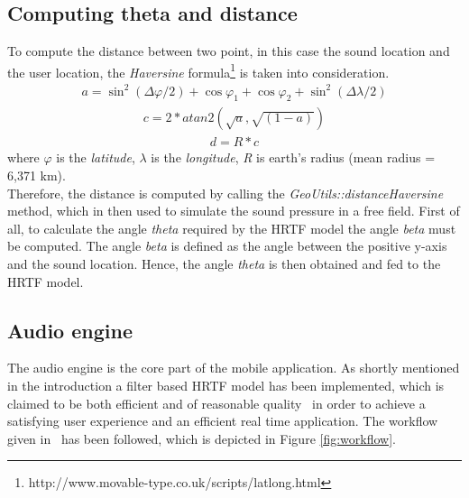 \documentclass[journal]{IEEEtran}
\begin{document}
\subsection{Computing theta and distance}
To compute the distance between two point, in this case the sound location and the user location, the \textit{Haversine} formula\footnote{http://www.movable-type.co.uk/scripts/latlong.html} is taken into consideration.
\begin{equation}\label{eq:distancehaversine1}
\begin{split}
  a = {\sin}^{2}(\Delta\varphi / 2) + \cos \varphi _1 + \cos \varphi _2 + \sin^2(\Delta\lambda / 2)
\end{split}
\end{equation}
\begin{equation}\label{eq:distancehaversine2}
\begin{split}
  c = 2 * atan2(\sqrt{a},\sqrt{(1-a)}) 
\end{split}
\end{equation}
\begin{equation}\label{eq:distancehaversine3}
\begin{split}
  d = R * c
\end{split}
\end{equation}
where $\varphi$ is the \emph{latitude}, $\lambda$ is the \emph{longitude}, \emph{R} is earth's radius (mean radius = 6,371 km). \\
Therefore, the distance is computed by calling the \emph{GeoUtils::distanceHaversine} method, which in then used to simulate the sound pressure in a free field. First of all, to calculate the angle \textit{theta} required by the HRTF model the angle \textit{beta} must be computed. The angle \textit{beta} is defined as the angle between the positive y-axis and the sound location. Hence, the angle \textit{theta} is then obtained and fed to the HRTF model.

\subsection{Audio engine}
The audio engine is the core part of the mobile application. As shortly mentioned in the introduction a filter based HRTF model has been implemented, which is claimed to be both efficient and of reasonable quality~\cite{Brown1997} in order to achieve a satisfying user experience and an efficient real time application. The workflow given in~\cite{Brown1997} has been followed, which is depicted in Figure \ref{fig:workflow}. 
\end{document}
